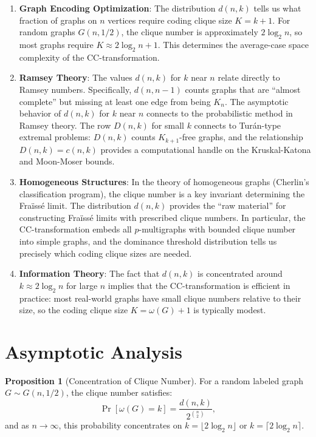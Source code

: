 \documentclass[11pt,a4paper]{article}
\theoremstyle{definition}
\newtheorem{proposition}{Proposition}[section]
\begin{document}
\begin{enumerate}
\item \textbf{Graph Encoding Optimization}: The distribution $d(n, k)$ tells us what fraction of graphs on $n$ vertices require coding clique size $K = k + 1$. For random graphs $G(n, 1/2)$, the clique number is approximately $2 \log_2 n$, so most graphs require $K \approx 2 \log_2 n + 1$. This determines the average-case space complexity of the CC-transformation.

\item \textbf{Ramsey Theory}: The values $d(n, k)$ for $k$ near $n$ relate directly to Ramsey numbers. Specifically, $d(n, n-1)$ counts graphs that are ``almost complete'' but missing at least one edge from being $K_n$. The asymptotic behavior of $d(n, k)$ for $k$ near $n$ connects to the probabilistic method in Ramsey theory. The row $D(n, k)$ for small $k$ connects to Tur\'an-type extremal problems: $D(n, k)$ counts $K_{k+1}$-free graphs, and the relationship $D(n, k) = c(n, k)$ provides a computational handle on the Kruskal-Katona and Moon-Moser bounds.

\item \textbf{Homogeneous Structures}: In the theory of homogeneous graphs (Cherlin's classification program), the clique number is a key invariant determining the Fra\"iss\'e limit. The distribution $d(n, k)$ provides the ``raw material'' for constructing Fra\"iss\'e limits with prescribed clique numbers. In particular, the CC-transformation embeds all $p$-multigraphs with bounded clique number into simple graphs, and the dominance threshold distribution tells us precisely which coding clique sizes are needed.

\item \textbf{Information Theory}: The fact that $d(n, k)$ is concentrated around $k \approx 2\log_2 n$ for large $n$ implies that the CC-transformation is efficient in practice: most real-world graphs have small clique numbers relative to their size, so the coding clique size $K = \omega(G) + 1$ is typically modest.
\end{enumerate}

\section{Asymptotic Analysis}

\begin{proposition}[Concentration of Clique Number]
For a random labeled graph $G \sim G(n, 1/2)$, the clique number satisfies:
\[
\Pr[\omega(G) = k] = \frac{d(n, k)}{2^{\binom{n}{2}}},
\]
and as $n \to \infty$, this probability concentrates on $k = \lfloor 2\log_2 n \rfloor$ or $k = \lceil 2\log_2 n \rceil$.
\end{proposition}
\end{document}
